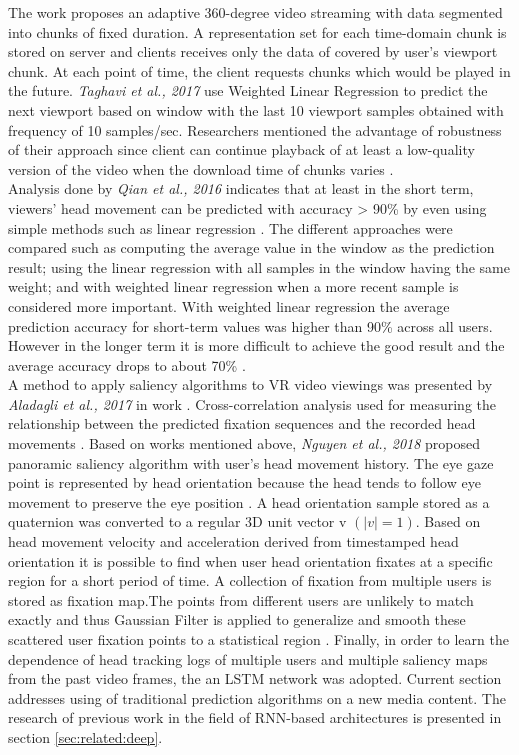 The work \cite{linreg3} proposes an adaptive 360-degree video streaming with data segmented into chunks of fixed duration. A representation set for each time-domain chunk is stored on server and clients receives only the data of covered by user's viewport chunk. At each point of time, the client requests chunks which would be played in the future. \textit{Taghavi et al., 2017} use Weighted Linear Regression to predict the next viewport based on window with the last 10 viewport samples obtained with frequency of 10 samples/sec. Researchers mentioned the advantage of robustness of their approach since client can continue playback of at least a low-quality version of the video when the download time of chunks varies \cite{linreg3}.\\
Analysis done by \textit{Qian et al., 2016} indicates that at least in the short term, viewers’ head movement can be predicted with accuracy > 90\% by even using simple methods such as linear regression \cite{cellular_opt}. The different approaches were compared such as computing the average value in the window as the prediction result; using the linear regression with all samples in the window having the same weight; and with weighted linear regression when a more recent sample is considered more important. With weighted linear regression the average prediction accuracy for short-term values was higher than 90\% across all users. However in the longer term it is more difficult to achieve the good result and the average accuracy drops to about 70\% \cite{cellular_opt}.\\
A method to apply saliency algorithms to VR video viewings was presented by \textit{Aladagli et al., 2017} in work \cite{predicting_360}. Cross-correlation analysis used for measuring the relationship between the predicted fixation sequences and the recorded head movements \cite{predicting_360}. Based on works mentioned above, \textit{Nguyen et al., 2018} proposed panoramic saliency algorithm with user’s head movement history. The eye gaze point is represented by head orientation because the head tends to follow eye movement to preserve the eye position \cite{attention_saliency}. A head orientation sample stored as a quaternion was converted to a regular 3D unit vector v $(| v | = 1)$. Based on head movement velocity and acceleration derived from timestamped head orientation it is possible to find when user head orientation fixates at a specific region for a short period of time. A collection of fixation from multiple users is stored as fixation map.The points from different users are unlikely to match exactly and thus Gaussian Filter is applied to generalize and smooth these scattered user fixation points to a statistical region \cite{attention_saliency}. Finally, in order to learn the dependence of head tracking logs of multiple users and multiple saliency maps from the past video frames, the an LSTM network was adopted. Current section addresses using of traditional prediction algorithms on a new media content. The research of previous work in the field of RNN-based architectures is presented in section \ref{sec:related:deep}. 

